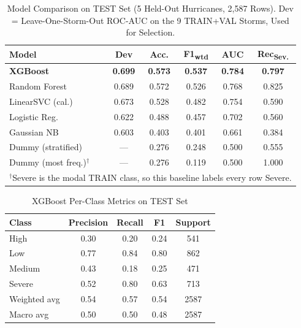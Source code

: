 \documentclass[conference]{IEEEtran}
\renewcommand{\_}{\origunderscore\allowbreak}
\begin{document}
\begin{table}[htbp]
\caption{Model Comparison on TEST Set (5 Held-Out Hurricanes,
2,587 Rows). Dev = Leave-One-Storm-Out ROC-AUC on the 9
TRAIN+VAL Storms, Used for Selection.}
\label{tab:clf_results}
\centering
\small
\setlength{\tabcolsep}{3.5pt}
\begin{tabular}{lccccc}
\toprule
\textbf{Model} & \textbf{Dev} & \textbf{Acc.} & \textbf{F1\textsubscript{wtd}} &
\textbf{AUC} & \textbf{Rec\textsubscript{Sev.}} \\
\midrule
\textbf{XGBoost}   & \textbf{0.699} & \textbf{0.573} & \textbf{0.537} & \textbf{0.784} & \textbf{0.797} \\
Random Forest      & 0.689 & 0.572 & 0.526 & 0.768 & 0.825 \\
LinearSVC (cal.)   & 0.673 & 0.528 & 0.482 & 0.754 & 0.590 \\
Logistic Reg.      & 0.622 & 0.488 & 0.457 & 0.702 & 0.560 \\
Gaussian NB        & 0.603 & 0.403 & 0.401 & 0.661 & 0.384 \\
\midrule
Dummy (stratified)           & --- & 0.276 & 0.248 & 0.500 & 0.555 \\
Dummy (most freq.)$^\dagger$ & --- & 0.276 & 0.119 & 0.500 & 1.000 \\
\bottomrule
\multicolumn{6}{p{0.94\columnwidth}}{\footnotesize $^\dagger$Severe
is the modal TRAIN class, so this baseline labels every row
Severe.}\\
\end{tabular}
\end{table}

\begin{table}[htbp]
\caption{XGBoost Per-Class Metrics on TEST Set}
\label{tab:perclass}
\centering
\small
\begin{tabular}{lcccc}
\toprule
\textbf{Class} & \textbf{Precision} & \textbf{Recall} & \textbf{F1} & \textbf{Support} \\
\midrule
High    & 0.30 & 0.20 & 0.24 & 541  \\
Low     & 0.77 & 0.84 & 0.80 & 862  \\
Medium  & 0.43 & 0.18 & 0.25 & 471  \\
Severe  & 0.52 & 0.80 & 0.63 & 713  \\
\midrule
Weighted avg & 0.54 & 0.57 & 0.54 & 2587 \\
Macro avg    & 0.50 & 0.50 & 0.48 & 2587 \\
\bottomrule
\end{tabular}
\end{table}
\end{document}
